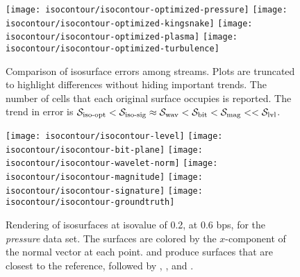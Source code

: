 \begin{figure*}[t]
\centering
{}
{\texttt{[image: isocontour/isocontour-optimized-pressure]}\vspace{-0.5em}}
{\texttt{[image: isocontour/isocontour-optimized-kingsnake]}\vspace{-0.5em}}
{\texttt{[image: isocontour/isocontour-optimized-plasma]}\vspace{-0.5em}}
{\texttt{[image: isocontour/isocontour-optimized-turbulence]}\vspace{-0.5em}}
\vspace{-0.5em}
\caption{Comparison of isosurface errors among streams. Plots are truncated to highlight differences
without hiding important trends. The number of cells that each original surface occupies is
reported. The trend in error is $\siop < \sisg \approx \swav < \sbit < \smag <<
\slvl$.}\label{fig:isocontour-plots}
\vspace{1em}

\centering
{}
{\texttt{[image: isocontour/isocontour-level]}\vspace{-0.5em}}
{\texttt{[image: isocontour/isocontour-bit-plane]}\vspace{-0.5em}}
{\texttt{[image: isocontour/isocontour-wavelet-norm]}\vspace{-0.5em}}
{\texttt{[image: isocontour/isocontour-magnitude]}\vspace{-0.5em}}
{\texttt{[image: isocontour/isocontour-signature]}\vspace{-0.5em}}
{\texttt{[image: isocontour/isocontour-groundtruth]}\vspace{-0.5em}}
\vspace{-0.5em}
\caption{Rendering of isosurfaces at isovalue of 0.2, at 0.6 bps, for the \emph{pressure} data set.
The surfaces are colored by the $x$-component of the normal vector at each point. \swav and
\sisg produce surfaces that are closest to the reference, followed by \sbit, \smag, and \slvl.}
\label{fig:isocontour-surfaces-pressure}
\vspace{-1.5em}
\end{figure*}


